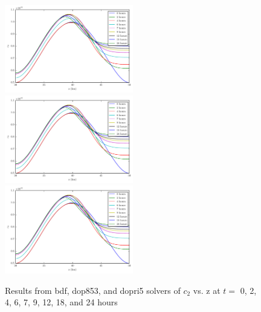 \documentclass[twocolumn,10pt]{asme2ej}
\begin{document}
\begin{figure}[thb]
\begin{center}
\includegraphics[width=0.5\textwidth]{figure/bdf c2.pdf}
\includegraphics[width=0.5\textwidth]{figure/dop853 c2.pdf}
\includegraphics[width=0.5\textwidth]{figure/dopri5 c2.pdf}
\caption{Results from bdf, dop853, and dopri5 solvers of $c_2$ vs. z at $t = $ 0, 2, 4, 6, 7, 9, 12, 18, and 24 hours}
\label{c2}
\end{center}
\end{figure}
\end{document}
